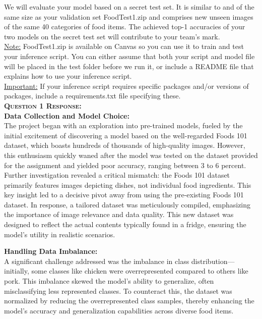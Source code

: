 \documentclass[runningheads]{llncs}
\newcommand{\SubSec}[1]{\vspace{1em}\noindent\textsc{\textbf{#1}}\vspace{0.5em} \\} %
\begin{document}
\noindent We will evaluate your model based on a secret test set. It is similar to and of the same size as your validation set FoodTest1.zip and comprises new unseen images of the same 40 categories of food items. The achieved top-1 accuracies of your two models on the secret test set will contribute to your team's mark. \\
\noindent \underline{Note:} FoodTest1.zip is available on Canvas so you can use it to train and test your inference script. You can either assume that both your script and model file will be placed in the test folder before we run it, or include a README file that explains how to use your inference script. \\
\noindent \underline{Important:} If your inference script requires specific packages and/or versions of packages, include a requirements.txt file specifying these. \\

\SubSec{Question 1 Response:}

\noindent\textbf{Data Collection and Model Choice:} \\
The project began with an exploration into pre-trained models, fueled by the initial excitement of discovering a model based on the well-regarded Foods 101 dataset, which boasts hundreds of thousands of high-quality images. However, this enthusiasm quickly waned after the model was tested on the dataset provided for the assignment and yielded poor accuracy, ranging between 3 to 6 percent. Further investigation revealed a critical mismatch: the Foods 101 dataset primarily features images depicting dishes, not individual food ingredients. This key insight led to a decisive pivot away from using the pre-existing Foods 101 dataset. In response, a tailored dataset was meticulously compiled, emphasizing the importance of image relevance and data quality. This new dataset was designed to reflect the actual contents typically found in a fridge, ensuring the model’s utility in realistic scenarios.

\noindent\textbf{Handling Data Imbalance:} \\
A significant challenge addressed was the imbalance in class distribution—initially, some classes like chicken were overrepresented compared to others like pork. This imbalance skewed the model's ability to generalize, often misclassifying less represented classes. To counteract this, the dataset was normalized by reducing the overrepresented class samples, thereby enhancing the model's accuracy and generalization capabilities across diverse food items.
\end{document}
